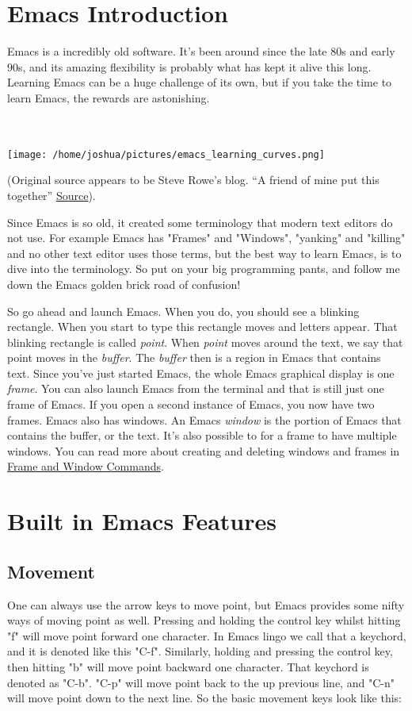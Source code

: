 \documentclass[11pt]{article}
\begin{document}
\section{Emacs Introduction}
\label{sec:orgheadline3}
Emacs is a incredibly old software.  It's been around since the late 80s and early 90s, and its amazing flexibility is probably what has kept it alive this long.  Learning Emacs can be a huge challenge of its own, but if you take the time to learn Emacs, the rewards are astonishing.

\\
\\

\texttt{[image: /home/joshua/pictures/emacs\_learning\_curves.png]}

(Original source appears to be Steve Rowe's blog. “A friend of mine put this together” \href{https://blogs.msdn.microsoft.com/steverowe/2004/11/17/code-editor-learning-curves/}{Source}).


Since Emacs is so old, it created some terminology that modern text editors do not use.  For example Emacs has "Frames" and "Windows", "yanking" and "killing" and no other text editor uses those terms, but the best way to learn Emacs, is to dive into the terminology.  So put on your big programming pants, and follow me down the Emacs golden brick road of confusion!

So go ahead and launch Emacs. When you do, you should see a blinking rectangle.  When you start to type this rectangle moves and letters appear.  That blinking rectangle is called \emph{point}.  When \emph{point} moves around the text, we say that point moves in the \emph{buffer}.  The \emph{buffer} then is a region in Emacs that contains text.  Since you've just started Emacs, the whole Emacs graphical display is one \emph{frame}.  You can also launch Emacs from the terminal and that is still just one frame of Emacs.  If you open a second instance of Emacs, you now have two frames.  Emacs also has windows.  An Emacs \emph{window} is the portion of Emacs that contains the buffer, or the text.  It's also possible to for a frame to have multiple windows.  You can read more about creating and deleting windows and frames in \hyperref[sec:orgheadline2]{Frame and Window Commands}.

\section{Built in Emacs Features}
\label{sec:orgheadline19}
\subsection{Movement}
\label{sec:orgheadline4}
One can always use the arrow keys to move point, but Emacs provides some nifty ways of moving point as well.  Pressing and holding the control key whilst hitting "f" will move point forward one character.  In Emacs lingo we call that a keychord, and it is denoted like this "C-f".  Similarly, holding and pressing the control key, then hitting "b" will move point backward one character.  That keychord is denoted as "C-b".  "C-p" will move point back to the up previous line, and "C-n" will move point down to the next line.  So the basic movement keys look like this:
\end{document}
